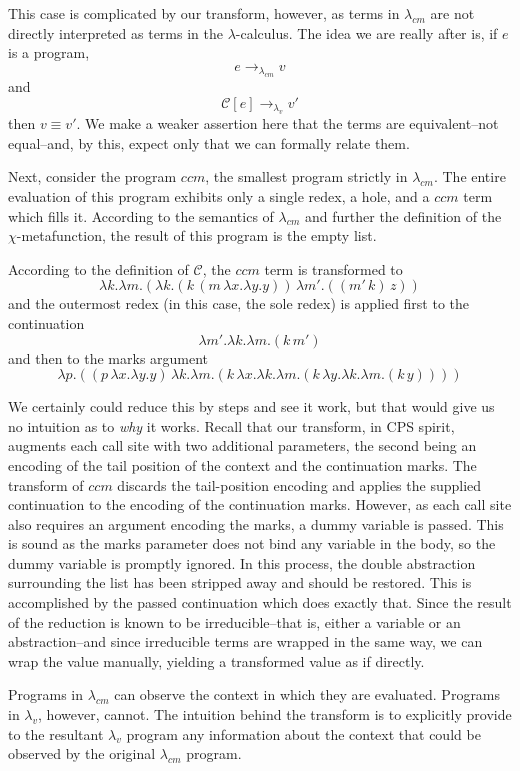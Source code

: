 \documentclass[ms,electronic,twosidetoc,letterpaper,chaptercenter,parttop]{byumsphd}
\begin{document}
This case is complicated by our transform, however, as terms in $\lambda_{cm}$ are not 
directly interpreted as terms in the $\lambda$-calculus. The idea we are really after is, 
if $e$ is a program,
\[
e\rightarrow_{\lambda_{cm}}v
\]
and
\[
\mathcal{C}[e]\rightarrow_{\lambda_{v}}v'
\]
then $v\equiv v'$. We make a weaker assertion here that the terms are equivalent--not 
equal--and, by this, expect only that we can formally relate them.

Next, consider the program $ccm$, the smallest program strictly in $\lambda_{cm}$. 
The entire evaluation of this program exhibits only a single redex, a hole, and a $ccm$ 
term which fills it. According to the semantics of $\lambda_{cm}$ and further the definition of the 
$\chi$-metafunction, the result of this program is the empty list.

According to the definition of $\mathcal{C}$, the $ccm$ term is transformed to
\[
\lambda k.\lambda m.(\lambda k.(k\,(m\,\lambda x.\lambda y.y))\,\lambda m'.((m'\,k)\,z))
\]
and the outermost redex (in this case, the sole redex) is applied first to the continuation
\[
\lambda m'.\lambda k.\lambda m.(k\,m')
\]
and then to the marks argument
\[
\lambda p.((p\,\lambda x.\lambda y.y)\,\lambda k.\lambda m.(k\,\lambda x.\lambda k.\lambda m.(k\,\lambda y.\lambda k.\lambda m.(k\,y))))
\]

We certainly could reduce this by steps and see it work, but that would give us no intuition as to \emph{why} it works. Recall that our transform, in CPS spirit, augments each call site with two additional parameters, the second being an encoding of the tail position of the context and the continuation marks. The transform of $ccm$ discards the tail-position encoding and applies the supplied continuation to the encoding of the continuation marks. However, as each call site also requires an argument encoding the marks, a dummy variable is passed. This is sound as the marks parameter does not bind any variable in the body, so the dummy variable is promptly ignored. In this process, the double abstraction surrounding the list has been stripped away and should be restored. This is accomplished by the passed continuation which does exactly that. Since the result of the reduction is known to be irreducible--that is, either a variable or an abstraction--and since irreducible terms are wrapped in the same way, we can wrap the value manually, yielding a transformed value as if directly.

Programs in $\lambda_{cm}$ can observe the context in which they are evaluated. Programs
in $\lambda_v$, however, cannot. The intuition behind the transform is to explicitly
provide to the resultant $\lambda_v$ program any information about the context that could
be observed by the original $\lambda_{cm}$ program.
\end{document}
